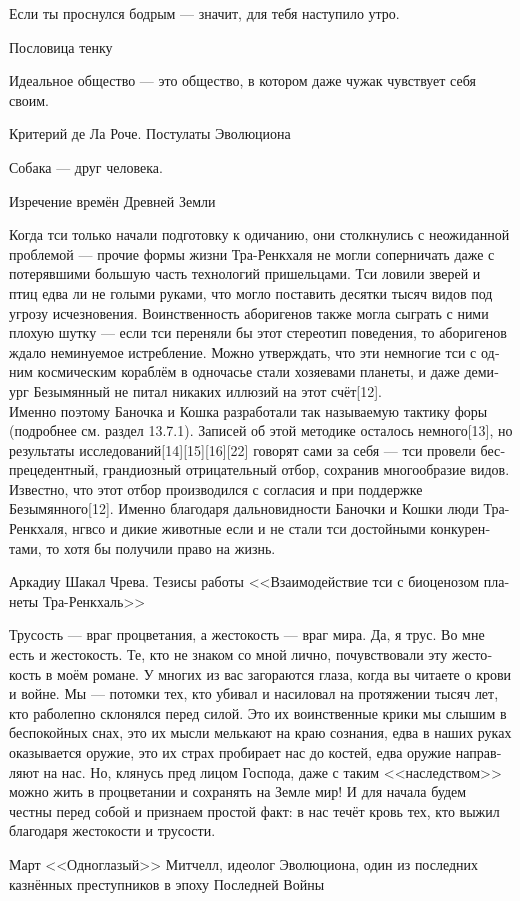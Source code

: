 \documentclass[a4paper,12pt,fleqn]{book}\usepackage{polyglossia}\setdefaultlanguage[babelshorthands=true]{russian}\setotherlanguage{english}\defaultfontfeatures{Ligatures=TeX,Mapping=tex-text}\usepackage{xcolor}\newcommand{\ml}[3]{#2}
\begin{document}
{\epigraph
{Если ты проснулся бодрым --- значит, для тебя наступило утро.}
{Пословица тенку}

\epigraph
{Идеальное общество --- это общество, в котором даже чужак чувствует себя своим.}
{Критерий де Ла Роче.
Постулаты Эволюциона}

\epigraph
{Собака --- друг человека.}
{Изречение времён Древней Земли}

\epigraph
{Когда тси только начали подготовку к одичанию, они столкнулись с неожиданной проблемой --- прочие формы жизни Тра-Ренкхаля не могли соперничать даже с потерявшими большую часть технологий пришельцами.
Тси ловили зверей и птиц едва ли не голыми руками, что могло поставить десятки тысяч видов под угрозу исчезновения.
Воинственность аборигенов также могла сыграть с ними плохую шутку --- если тси переняли бы этот стереотип поведения, то аборигенов ждало неминуемое истребление.
Можно утверждать, что эти немногие тси с одним космическим кораблём в одночасье стали хозяевами планеты, и даже демиург Безымянный не питал никаких иллюзий на этот счёт[12].\\
Именно поэтому Баночка и Кошка разработали так называемую тактику форы (подробнее см. раздел 13.7.1).
Записей об этой методике осталось немного[13], но результаты исследований[14][15][16][22] говорят сами за себя --- тси провели беспрецедентный, грандиозный отрицательный отбор, сохранив многообразие видов.
Известно, что этот отбор производился с согласия и при поддержке Безымянного[12].
Именно благодаря дальновидности Баночки и Кошки люди Тра-Ренкхаля, нгвсо и дикие животные если и не стали тси достойными конкурентами, то хотя бы получили право на жизнь.}
{Аркадиу Шакал Чрева.
Тезисы работы <<Взаимодействие тси с биоценозом планеты Тра-Ренкхаль>>}

\epigraph
{Трусость --- враг процветания, а жестокость --- враг мира.
Да, я трус.
Во мне есть и жестокость.
Те, кто не знаком со мной лично, почувствовали эту жестокость в моём романе.
У многих из вас загораются глаза, когда вы читаете о крови и войне.
Мы --- потомки тех, кто убивал и насиловал на протяжении тысяч лет, кто раболепно склонялся перед силой.
Это их воинственные крики мы слышим в беспокойных снах, это их мысли мелькают на краю сознания, едва в наших руках оказывается оружие, это их страх пробирает нас до костей, едва оружие направляют на нас.
Но, клянусь пред лицом Господа, даже с таким <<наследством>> можно жить в процветании и сохранять на Земле мир!
И для начала будем честны перед собой и признаем простой факт: в нас течёт кровь тех, кто выжил благодаря жестокости и трусости.}
{Март <<Одноглазый>> Митчелл, идеолог Эволюциона, один из последних казнённых преступников в эпоху Последней Войны}

}
\end{document}
